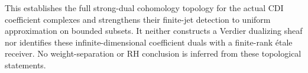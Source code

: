 This establishes the full strong-dual cohomology topology for the actual
CDI coefficient complexes and strengthens their finite-jet detection to
uniform approximation on bounded subsets. It neither constructs a
Verdier dualizing sheaf nor identifies these infinite-dimensional
coefficient duals with a finite-rank étale receiver. No
weight-separation or RH conclusion is inferred from these topological
statements.
